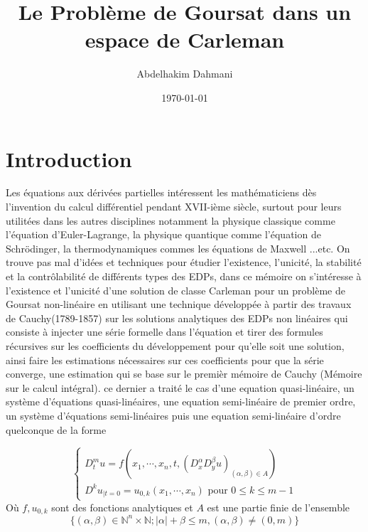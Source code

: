 \documentclass[12pt,a4paper]{report}
\author{Abdelhakim Dahmani}
\title{Le Problème de Goursat dans un espace de Carleman }
\date{\today}
\theoremstyle{plain}
\theoremstyle{definition}
\theoremstyle{remark}
\newcommand{\N}{\ensuremath{\mathbb{N}}}
\newcommand{\Nn}{\ensuremath{\mathbb{N}^n}}
\begin{document}

\setcounter{chapter}{-1}


%
%

 






\tableofcontents

\chapter*{Introduction}

Les équations aux dérivées partielles intéressent les mathématiciens dès l'invention du calcul différentiel pendant XVII-ième siècle, surtout pour leurs utilitées dans les autres disciplines notamment la physique classique comme l'équation d'Euler-Lagrange, la physique quantique comme l'équation de Schrödinger, la thermodynamiques commes les équations de Maxwell ...etc. On trouve pas mal d'idées et techniques pour étudier l'existence, l'unicité, la stabilité et la contrôlabilité de différents types des EDPs, dans ce  mémoire on s'intéresse à l'existence et l'unicité d'une solution de classe Carleman pour un problème de Goursat non-linéaire en utilisant une technique développée à partir des travaux de Cauchy(1789-1857) sur les solutions analytiques des EDPs non linéaires qui consiste à injecter une série formelle dans l'équation et tirer des formules récursives sur les coefficients du développement pour qu'elle soit une solution, ainsi faire les estimations nécessaires sur ces coefficients pour que la série converge, une estimation qui se base sur le premièr mémoire de Cauchy (Mémoire sur le calcul intégral). ce dernier a traité le cas d'une equation quasi-linéaire, un système d'équations quasi-linéaires, une equation semi-linéaire de premier ordre, un système d'équations semi-linéaires puis une equation semi-linéaire d'ordre quelconque de la forme 


\begin{equation*}
\left\{
\begin{array}{l}
D_t^mu = f(x_1,\cdots,x_n,t,( D_x^\alpha D_y^\beta u)_{(\alpha, \beta)\in A}) \\
D^ku_{|t=0}=u_{0,k}(x_1,\cdots,x_n) \text{ pour } 0 \leq k \leq m-1
\end{array}
\right.
\end{equation*}
 Où $f, u_{0,k}$ sont des fonctions analytiques et  $A$ est une partie finie de l'ensemble 
 $$ \{(\alpha , \beta )\in \Nn \times \N ; |\alpha|+\beta \leq m , (\alpha , \beta ) \neq (0,m) \}$$
\end{document}
